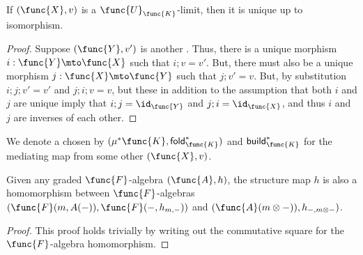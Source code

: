 % 
\begin{lemma}
\label{lemma:forgetful_limits_are_unique}
    If $(\func{X},v)$ is a $\func{U}_{\func{K}}$-limit, then it is unique
    up to isomorphism.
\end{lemma}
\begin{proof}
    Suppose $(\func{Y},v')$ is another . Thus, there is a unique
     morphism $i : \func{Y} \mto \func{X}$ such that $i;v = v'$.
    But, there must also be a unique  morphism $j : \func{X} \mto
    \func{Y}$ such that $j;v' = v$.  But, by substitution $i;j;v' = v'$
    and $j;i;v = v$, but these in addition to the assumption that both $i$
    and $j$ are unique imply that $i;j = \id_\func{Y}$ and $j;i =
    \id_\func{X}$, and thus $i$ and $j$ are inverses of each other. 
\end{proof}
% 
\noindent
We denote a chosen  by
$(\mu^*\func{K},\mathsf{fold}^*_\func{K})$ and
$\mathsf{build}^*_\func{K}$ for the mediating map from some other
 $(\func{X},v)$.

\begin{lemma}
    \label{lemma:from_structures_to_homomorphisms}
    Given any graded $\func{F}$-algebra $(\func{A},h)$, the structure map
    $h$ is also a homomorphism between $\func{F}$-algebras
    $(\func{F}(m,A(-)),\func{F}(-,h_{m,-}))$ and $(\func{A}(m \otimes -)),h_{-, m \otimes -})$.
\end{lemma}
\begin{proof}
    This proof holds trivially by writing out the commutative square for
    the $\func{F}$-algebra homomorphism.
\end{proof}
    
